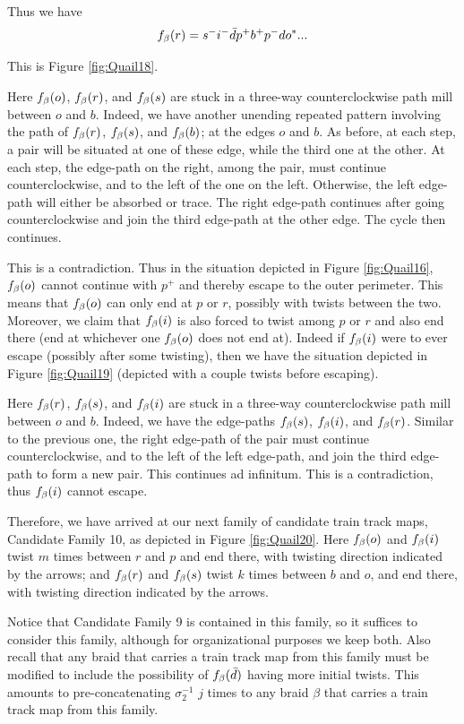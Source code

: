 Thus we have
\[
f_\beta(r) = s^- i^- \bar{d} p^+ b^+ p^- d o^*...
\]

This is Figure \ref{fig:Quail18}.

Here $f_\beta(o)$, $f_\beta(r)$, and $f_\beta(s)$ are stuck in a three-way counterclockwise path mill between $o$ and $b$. Indeed, we have another unending repeated pattern involving the path of $f_\beta(r)$, $f_\beta(s)$, and $f_\beta(b)$; at the edges $o$ and $b$. As before, at each step, a pair will be situated at one of these edge, while the third one at the other. At each step, the edge-path on the right, among the pair, must continue counterclockwise, and to the left of the one on the left. Otherwise, the left edge-path will either be absorbed or trace. The right edge-path continues after going counterclockwise and join the third edge-path at the other edge. The cycle then continues.

This is a contradiction. Thus in the situation depicted in Figure \ref{fig:Quail16}, $f_\beta(o)$ cannot continue with $p^+$ and thereby escape to the outer perimeter. This means that $f_\beta(o)$ can only end at $p$ or $r$, possibly with twists between the two. Moreover, we claim that $f_\beta(i)$ is also forced to twist among $p$ or $r$ and also end there (end at whichever one $f_\beta(o)$ does not end at). Indeed if $f_\beta(i)$ were to ever escape (possibly after some twisting), then we have the situation depicted in Figure \ref{fig:Quail19} (depicted with a couple twists before escaping).

Here $f_\beta(r)$, $f_\beta(s)$, and $f_\beta(i)$ are stuck in a three-way counterclockwise path mill between $o$ and $b$. Indeed, we have the edge-paths $f_\beta(s)$, $f_\beta(i)$, and $f_\beta(r)$. Similar to the previous one, the right edge-path of the pair must continue counterclockwise, and to the left of the left edge-path, and join the third edge-path to form a new pair. This continues ad infinitum. This is a contradiction, thus $f_\beta(i)$ cannot escape.

Therefore, we have arrived at our next family of candidate train track maps, Candidate Family 10, as depicted in Figure \ref{fig:Quail20}. Here $f_\beta(o)$ and $f_\beta(i)$ twist $m$ times between $r$ and $p$ and end there, with twisting direction indicated by the arrows; and $f_\beta(r)$ and $f_\beta(s)$ twist $k$ times between $b$ and $o$, and end there, with twisting direction indicated by the arrows.


Notice that Candidate Family 9 is contained in this family, so it suffices to consider this family, although for organizational purposes we keep both. Also recall that any braid that carries a train track map from this family must be modified to include the possibility of $f_\beta(\bar{d})$ having more initial twists. This amounts to pre-concatenating $\sigma_2^{-1}$ $j$ times to any braid $\beta$ that carries a train track map from this family.



